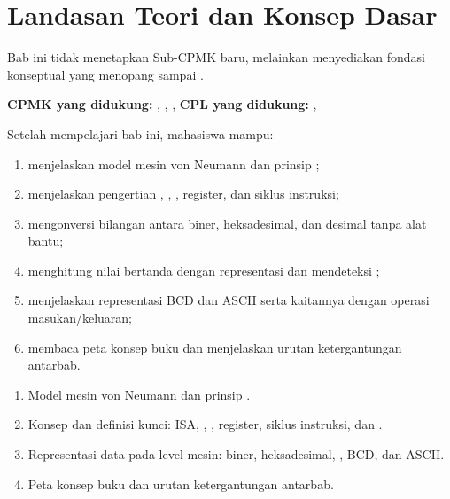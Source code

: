 \documentclass[../../main.tex]{subfiles}
\begin{document}
\chapter{Landasan Teori dan Konsep Dasar}
\label{chap:landasan-teori}


\begin{subcpmkbox}
Bab ini tidak menetapkan Sub-CPMK baru, melainkan menyediakan
fondasi konseptual yang menopang  sampai
.

\vspace{0.4em}
\textbf{CPMK yang didukung:} , ,
,  \quad\textbullet\quad
\textbf{CPL yang didukung:} , 
\end{subcpmkbox}

\begin{tujuanbox}
Setelah mempelajari bab ini, mahasiswa mampu:
\begin{enumerate}
    \item menjelaskan model mesin von Neumann dan prinsip
          ;
    \item menjelaskan pengertian ,
          , , register, dan siklus
          instruksi;
    \item mengonversi bilangan antara biner, heksadesimal, dan
          desimal tanpa alat bantu;
    \item menghitung nilai bertanda dengan representasi
           dan mendeteksi ;
    \item menjelaskan representasi BCD dan ASCII serta kaitannya
          dengan operasi masukan/keluaran;
    \item membaca peta konsep buku dan menjelaskan urutan
          ketergantungan antarbab.
\end{enumerate}
\end{tujuanbox}

\begin{materibox}
\begin{enumerate}
    \item Model mesin von Neumann dan prinsip .
    \item Konsep dan definisi kunci: ISA, ,
          , register, siklus instruksi, dan
          .
    \item Representasi data pada level mesin: biner, heksadesimal,
          , BCD, dan ASCII.
    \item Peta konsep buku dan urutan ketergantungan antarbab.
\end{enumerate}
\end{materibox}










\end{document}
